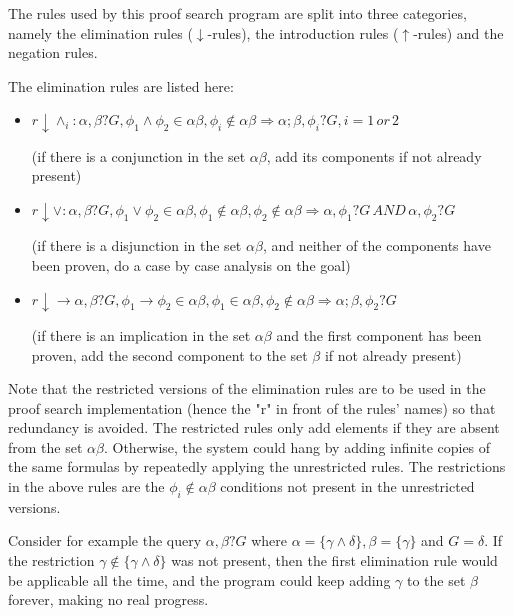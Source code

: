 \documentclass[11pt,twoside,a4paper]{report}
\begin{document}
The rules used by this proof search program are split into three categories, namely the elimination rules ($\downarrow$-rules), the introduction rules ($\uparrow$-rules) and the negation rules. 

The elimination rules are listed here:
\begin{itemize}
\item
$r\downarrow\wedge_i:\alpha,\beta?G, \phi_1\wedge\phi_2 \in \alpha\beta, \phi_i \notin \alpha\beta \Rightarrow \alpha;\beta,\phi_i?G, i = 1\, or\, 2$

(if there is a conjunction in the set $\alpha\beta$, add its components if not already present)
\item
$r\downarrow\vee:\alpha,\beta?G, \phi_1\vee\phi_2 \in \alpha\beta, \phi_1 \notin \alpha\beta, \phi_2 \notin \alpha\beta \Rightarrow \alpha,\phi_1?G\, AND\, \alpha,\phi_2?G$

(if there is a disjunction in the set $\alpha\beta$, and neither of the components have been proven, do a case by case analysis on the goal)
\item
$r\downarrow\rightarrow\alpha,\beta?G, \phi_1\rightarrow\phi_2 \in \alpha\beta, \phi_1 \in \alpha\beta, \phi_2 \notin \alpha\beta \Rightarrow \alpha;\beta,\phi_2?G$

(if there is an implication in the set $\alpha\beta$ and the first component has been proven, add the second component to the set $\beta$ if not already present)
\end{itemize}

Note that the restricted versions of the elimination rules are to be used in the proof search implementation (hence the "r" in front of the rules' names) so that redundancy is avoided. The restricted rules only add elements if they are absent from the set $\alpha\beta$. Otherwise, the system could hang by adding infinite copies of the same formulas by repeatedly applying the unrestricted rules. The restrictions in the above rules are the $\phi_i \notin \alpha\beta$ conditions not present in the unrestricted versions.

Consider for example the query $\alpha,\beta?G$ where $\alpha = \{\gamma\wedge\delta\}, \beta = \{\gamma\}$ and $G = \delta$. If the restriction $\gamma \notin \{\gamma\wedge\delta\}$ was not present, then the first elimination rule would be applicable all the time, and the program could keep adding $\gamma$ to the set $\beta$ forever, making no real progress.
\end{document}
